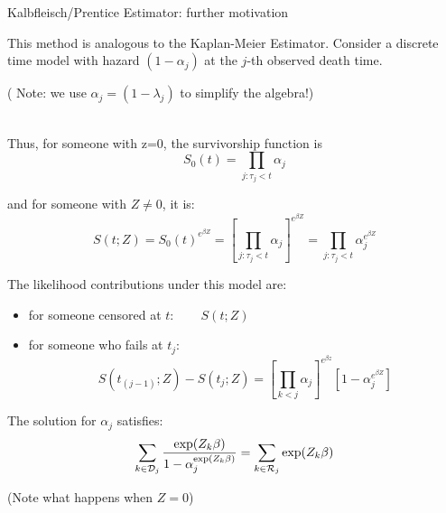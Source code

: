 \documentclass[envcountsect, 10pt, portrait, palatino]{beamer}
\begin{document}
\begin{frame}{ Kalbfleisch/Prentice Estimator: further motivation}

This method is analogous to the Kaplan-Meier Estimator.
Consider  a discrete time model with hazard $(1-\alpha_j)$
at the $j$-th observed death time.

( Note:  we use $\alpha_j=(1-\lambda_j)$ to simplify
the algebra!)

~\\[2ex]
Thus, for someone with z=0, the survivorship function is
\[ S_0(t) = \prod_{j: \tau_j < t} \alpha_j   \]

and for someone with $Z\neq0$, it is:
\[ S(t;Z) =  S_0(t)^{e^{\beta Z}} =
\left[\prod_{j: \tau_j < t} \alpha_j\right]^{e^{\beta Z}}
= \prod_{j: \tau_j < t} \alpha_j^{e^{\beta Z}} \]

\end{frame}
\begin{frame}
The likelihood contributions under this model are:

\begin{itemize}
\item for someone censored at $t$: ~~~ $ S(t;Z)$
\item for someone who fails at $t_j$:~~~
\[ S(t_{(j-1)};Z) -   S(t_j;Z) = \left[ \prod_{k < j}
        \alpha_j \right]^{e^{\beta z}}  [1 - \alpha_j^{e^{\beta Z}}] \]
\end{itemize}

The solution for $\alpha_j$ satisfies:
\[  \sum_{k \in {\cal D}_j} \frac{\exp(Z_k \beta)}{1 -
\alpha_j^{\exp(Z_k \beta)}}
            =  \sum_{k \in {\cal R}_j} \exp(Z_k \beta)  \]

(Note what happens when $Z=0$)
\end{frame}
\end{document}
